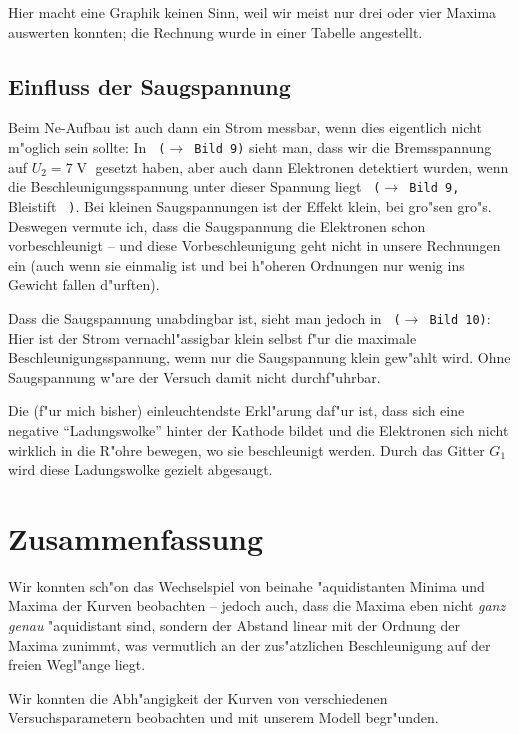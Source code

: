\documentclass[a4paper,12pt]{article}
\newcommand{\abs}[0]{\bigskip\noindent}
\newcommand{\bild}[1]{\texttt{ ($\rightarrow$ Bild #1)}}
\newcommand{\bildd}[2]{\texttt{ ($\rightarrow$ Bild #1,} #2 \texttt{ )}}
\begin{document}
Hier macht eine Graphik keinen Sinn, weil wir meist nur drei oder vier
Maxima auswerten konnten; die Rechnung wurde in einer Tabelle angestellt.





\subsection*{Einfluss der Saugspannung}

Beim Ne-Aufbau ist auch dann ein Strom messbar, wenn dies eigentlich nicht
m"oglich sein sollte: In \bild 9 sieht man, dass wir die Bremsspannung auf
$U_2=7\operatorname V$ gesetzt haben, aber auch dann Elektronen detektiert
wurden, wenn die Beschleunigungsspannung unter dieser Spannung liegt \bildd 9
{Bleistift}. Bei kleinen Saugspannungen ist der Effekt klein, bei gro"sen
gro"s. Deswegen vermute ich, dass die Saugspannung die Elektronen schon
vorbeschleunigt -- und diese Vorbeschleunigung geht nicht in unsere Rechnungen
ein (auch wenn sie einmalig ist und bei h"oheren Ordnungen nur wenig ins
Gewicht fallen d"urften).

\abs
Dass die Saugspannung unabdingbar ist, sieht man jedoch in \bild {10}: Hier ist
der Strom vernachl"assigbar klein selbst f"ur die maximale
Beschleunigungsspannung, wenn nur die Saugspannung klein gew"ahlt wird. Ohne
Saugspannung w"are der Versuch damit nicht durchf"uhrbar.

Die (f"ur mich bisher) einleuchtendste Erkl"arung daf"ur ist, dass sich eine negative "`Ladungswolke"' hinter der Kathode bildet und die Elektronen sich nicht wirklich in die R"ohre bewegen, wo sie beschleunigt werden. Durch das Gitter $G_1$ wird diese Ladungswolke gezielt abgesaugt.





\section*{Zusammenfassung}


Wir konnten sch"on das Wechselspiel von beinahe "aquidistanten Minima und Maxima der Kurven beobachten -- jedoch auch, dass die Maxima eben nicht \emph{ganz genau} "aquidistant sind, sondern der Abstand linear mit der Ordnung der Maxima zunimmt, was vermutlich an der zus"atzlichen Beschleunigung auf der freien Wegl"ange liegt.

Wir konnten die Abh"angigkeit der Kurven von verschiedenen Versuchsparametern beobachten und mit unserem Modell begr"unden.
\end{document}
